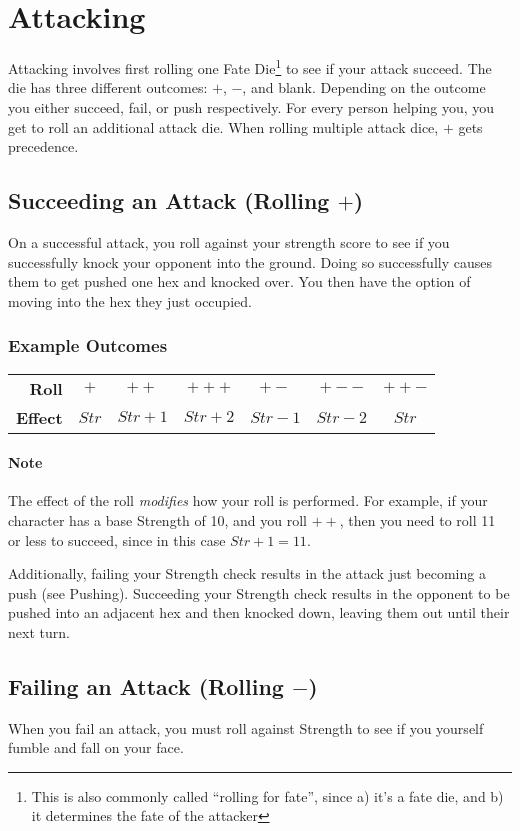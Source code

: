 \section{Attacking} \label{attacking}
Attacking involves first rolling one Fate Die\footnote{This is also commonly called ``rolling for fate'', since a) it's a fate die, and b) it determines the fate of the attacker} to see if your attack succeed.
The die has three different outcomes: $+$, $-$, and blank. Depending on the outcome you either succeed, fail, or push respectively.
For every person helping you, you get to roll an additional attack die. When rolling multiple attack dice, $+$ gets precedence.

\subsection{Succeeding an Attack (Rolling $+$)}
On a successful attack, you roll against your strength score to see if you successfully knock your opponent into the ground. Doing so successfully causes them to get pushed one hex and knocked over. You then have the option of moving into the hex they just occupied.
\subsubsection{Example Outcomes}
\begin{tabular}{r|c|c|c|c|c|c}
    \textbf{Roll} & $+$ & $++$ & $+++$ & $+-$ & $+--$ & $++-$ \\
    \textbf{Effect} & $Str$ & $Str+1$ & $Str+2$ & $Str-1$ & $Str-2$ & $Str$
\end{tabular}

\paragraph{Note} The effect of the roll \textit{modifies} how your roll is performed. For example, if your character has a base Strength of 10, and you roll $++$, then you need to roll 11 or less to succeed, since in this case $Str+1=11$.

Additionally, failing your Strength check results in the attack just becoming a push (see Pushing).
Succeeding your Strength check results in the opponent to be pushed into an adjacent hex and then knocked down, leaving them out until their next turn.

\subsection{Failing an Attack (Rolling $-$)}
When you fail an attack, you must roll against Strength to see if you yourself fumble and fall on your face. 
